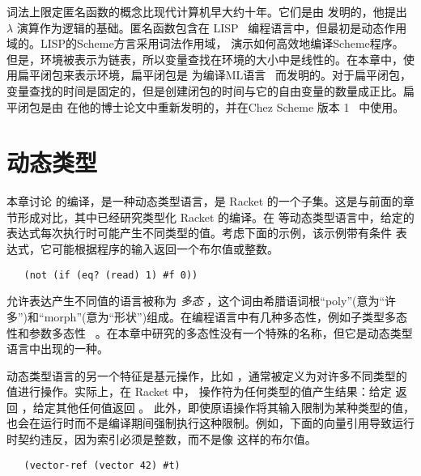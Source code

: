 \documentclass[11pt]{book}
\begin{document}
词法上限定匿名函数的概念比现代计算机早大约十年。它们是由
\citet{Church:1932aa} 发明的，他提出 $\lambda$ 演算作为逻辑的基础。匿名函数包含在
LISP~\citep{McCarthy:1960dz} 编程语言中，但最初是动态作用域的。LISP的Scheme方言采用词法作用域， \citet{Guy-L.-Steele:1978yq} 演示如何高效地编译Scheme程序。但是，环境被表示为链表，所以变量查找在环境的大小中是线性的。在本章中，使用扁平闭包来表示环境，扁平闭包是
\citet{Cardelli:1983aa,Cardelli:1984aa} 为编译ML语言~\citep{Gordon:1978aa,Milner:1990fk} 而发明的。对于扁平闭包，变量查找的时间是固定的，但是创建闭包的时间与它的自由变量的数量成正比。扁平闭包是由 \citet{Dybvig:1987ab} 在他的博士论文中重新发明的，并在Chez Scheme 版本 1~\citep{Dybvig:2006aa} 中使用。


\chapter{动态类型}
\label{ch:Rdyn}

本章讨论 \LangDyn{} 的编译，是一种动态类型语言，是 Racket 的一个子集。这是与前面的章节形成对比，其中已经研究类型化 Racket 的编译。在 \LangDyn{} 等动态类型语言中，给定的表达式每次执行时可能产生不同类型的值。考虑下面的示例，该示例带有条件 
表达式，它可能根据程序的输入返回一个布尔值或整数。
\begin{lstlisting}
   (not (if (eq? (read) 1) #f 0))
\end{lstlisting}
允许表达产生不同值的语言被称为 \emph{多态} ，这个词由希腊语词根“poly”(意为“许多”)和“morph”(意为“形状”)组成。在编程语言中有几种多态性，例如子类型多态性和参数多态性~\citep{Cardelli:1985kx} 。在本章中研究的多态性没有一个特殊的名称，但它是动态类型语言中出现的一种。

动态类型语言的另一个特征是基元操作，比如  ，通常被定义为对许多不同类型的值进行操作。实际上，在 Racket 中， 
操作符为任何类型的值产生结果：给定  返回  ，给定其他任何值返回  。
此外，即使原语操作将其输入限制为某种类型的值，也会在运行时而不是编译期间强制执行这种限制。例如，下面的向量引用导致运行时契约违反，因为索引必须是整数，而不是像  这样的布尔值。
\begin{lstlisting}
   (vector-ref (vector 42) #t)
\end{lstlisting}
\end{document}
